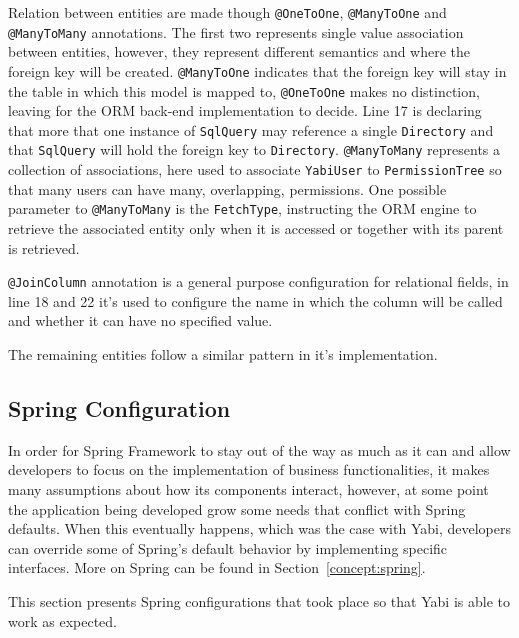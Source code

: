 Relation between entities are made though \texttt{@OneToOne}, \texttt{@ManyToOne} and \texttt{@ManyToMany} annotations.
The first two represents single value association between entities, however, they represent different semantics and where the foreign key will be created.
\texttt{@ManyToOne} indicates that the foreign key will stay in the table in which this model is mapped to, \texttt{@OneToOne} makes no distinction, leaving for the \gls{ORM} back-end implementation to decide.
Line 17 is declaring that more that one instance of \texttt{SqlQuery} may reference a single \texttt{Directory} and that \texttt{SqlQuery} will hold the foreign key to \texttt{Directory}.
\texttt{@ManyToMany} represents a collection of associations, here used to associate \texttt{YabiUser} to \texttt{PermissionTree} so that many users can have many, overlapping, permissions. One possible parameter to \texttt{@ManyToMany} is the \texttt{FetchType}, instructing the \gls{ORM} engine to retrieve the associated entity only when it is accessed or together with its parent is retrieved.

\texttt{@JoinColumn} annotation is a general purpose configuration for relational fields, in line 18 and 22 it's used to configure the name in which the column will be called and whether it can have no specified value.



The remaining entities follow a similar pattern in it's implementation.

\subsection{Spring Configuration}
In order for Spring Framework to stay out of the way as much as it can and allow developers to focus on the implementation of business functionalities, it makes many assumptions about how its components interact, however, at some point the application being developed grow some needs that conflict with Spring defaults. When this eventually happens, which was the case with \gls{Yabi}, developers can override some of Spring's default behavior by implementing specific interfaces. More on Spring can be found in Section~\ref{concept:spring}.

This section presents Spring configurations that took place so that \gls{Yabi} is able to work as expected.

